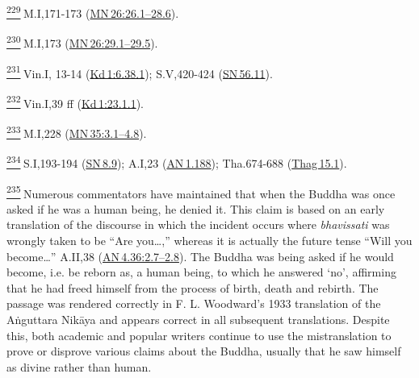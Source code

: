 \label{footprints_split_024.html_fn229}
\hyperref[footprints_split_009.htmlux5cux23fnref229]{\textsuperscript{229}} M.I,171-173
(\href{https://suttacentral.net/mn26/en/sujato\#26.1}{MN\,26:26.1--28.6}).

\label{footprints_split_024.html_fn230}
\hyperref[footprints_split_009.htmlux5cux23fnref230]{\textsuperscript{230}} M.I,173
(\href{https://suttacentral.net/mn26/en/sujato\#29.1}{MN\,26:29.1--29.5}).

\label{footprints_split_024.html_fn231}
\hyperref[footprints_split_009.htmlux5cux23fnref231]{\textsuperscript{231}} Vin.I,
13-14
(\href{https://suttacentral.net/pli-tv-kd1/en/brahmali\#6.38.1}{Kd\,1:6.38.1});
S.V,420-424
(\href{https://suttacentral.net/sn56.11/en/sujato}{SN\,56.11}).

\label{footprints_split_024.html_fn232}
\hyperref[footprints_split_009.htmlux5cux23fnref232]{\textsuperscript{232}} Vin.I,39
ff
(\href{https://suttacentral.net/pli-tv-kd1/en/brahmali\#23.1.1}{Kd\,1:23.1.1}).

\label{footprints_split_024.html_fn233}
\hyperref[footprints_split_009.htmlux5cux23fnref233]{\textsuperscript{233}} M.I,228
(\href{https://suttacentral.net/mn35/en/sujato\#3.1}{MN\,35:3.1--4.8}).

\label{footprints_split_024.html_fn234}
\hyperref[footprints_split_009.htmlux5cux23fnref234]{\textsuperscript{234}} S.I,193-194
(\href{https://suttacentral.net/sn8.9/en/sujato}{SN\,8.9}); A.I,23
(\href{https://suttacentral.net/an1.188/en/sujato}{AN\,1.188});
Tha.674-688
(\href{https://suttacentral.net/thag15.1/en/sujato}{Thag\,15.1}).

\label{footprints_split_024.html_fn235}
\hyperref[footprints_split_010.htmlux5cux23fnref235]{\textsuperscript{235}} Numerous
commentators have maintained that when the Buddha was once asked if he
was a human being, he denied it. This claim is based on an early
translation of the discourse in which the incident occurs where
\emph{bhavissati} was wrongly taken to be ``Are you\ldots,'' whereas it
is actually the future tense ``Will you become\ldots'' A.II,38
(\href{https://suttacentral.net/an4.36/en/sujato\#2.7}{AN\,4.36:2.7--2.8}).
The Buddha was being asked if he would become, i.e. be reborn as, a
human being, to which he answered `no', affirming that he had freed
himself from the process of birth, death and rebirth. The passage was
rendered correctly in F. L. Woodward's 1933 translation of the Aṅguttara
Nikāya and appears correct in all subsequent translations. Despite this,
both academic and popular writers continue to use the mistranslation to
prove or disprove various claims about the Buddha, usually that he saw
himself as divine rather than human.

